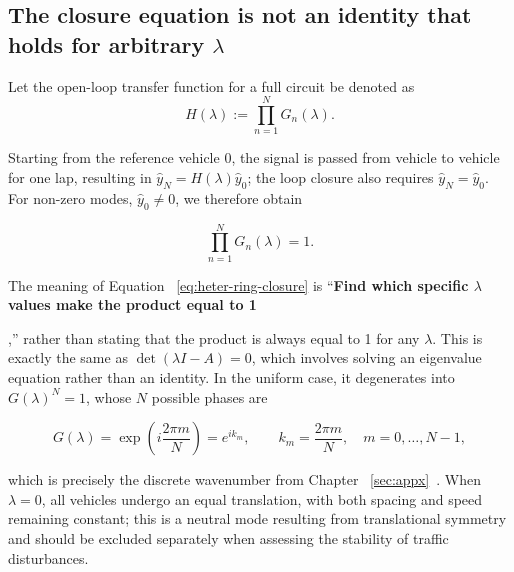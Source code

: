 \documentclass[11pt,a4paper,openany]{book}
\numberwithin{equation}{chapter}
\numberwithin{figure}{chapter}
\numberwithin{table}{chapter}
\begin{document}
\subsection{The closure equation is not an identity that holds for arbitrary $\lambda$}



Let the open-loop transfer function for a full circuit be denoted as
\[
H(\lambda):=\prod_{n=1}^{N}G_n(\lambda).
\]





Starting from the reference vehicle $0$, the signal is passed from vehicle to vehicle for one lap, resulting in $\hat y_N=H(\lambda)\hat y_0$; the loop closure also requires $\hat y_N=\hat y_0$. For non-zero modes, $\hat y_0\ne0$, we therefore obtain







\begin{tcolorbox}[keybox,title=\textbf{Circuit Characteristic Equation}]
\begin{equation}
\prod_{n=1}^{N} G_n(\lambda) = 1.
\label{eq:heter-ring-closure}
\end{equation}
\end{tcolorbox}







The meaning of Equation ~\eqref{eq:heter-ring-closure} is “\textbf{Find which specific $\lambda$ values make the product equal to 1}




,” rather than stating that the product is always equal to 1 for any $\lambda$. This is exactly the same as $\det(\lambda I-A)=0$, which involves solving an eigenvalue equation rather than an identity. In the uniform case, it degenerates into $G(\lambda)^N=1$, whose $N$ possible phases are

\[
G(\lambda)=\exp\!\left(i\frac{2\pi m}{N}\right)=e^{ik_m},
\qquad k_m=\frac{2\pi m}{N},\quad m=0,\ldots,N-1,
\]

which is precisely the discrete wavenumber from Chapter ~\ref{sec:appx}~. When $\lambda=0$, all vehicles undergo an equal translation, with both spacing and speed remaining constant; this is a neutral mode resulting from translational symmetry and should be excluded separately when assessing the stability of traffic disturbances.
\end{document}
